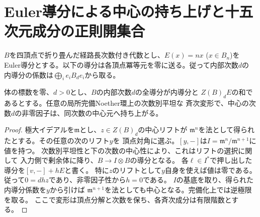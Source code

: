 \section{Euler導分による中心の持ち上げと十五次元成分の正則開集合}
\label{sec:quartic-euler-lifting}
$B$を四頂点で折り畳んだ経路長次数付き代数とし、$E(x)=n x$ ($x\in B_n$)を
Euler導分とする。以下の導分は各頂点冪等元を零に送る。従って内部次数$d$の
内導分の係数は$\bigoplus_i e_i B_d e_i$から取る。

\begin{proposition}\label{prop:euler-central-lifting}
体の標数を零、$d>0$とし、$B$の内部次数$d$の全導分が内導分と
$Z(B)_d E$の和であるとする。任意の局所完備Noether環上の次数別平坦な
斉次変形で、中心の次数$d$の非零因子は、同次数の中心元へ持ち上がる。
\end{proposition}
\begin{proof}
極大イデアルを$\mathfrak m$とし、$z\in Z(B)_d$の中心リフトが
$\mathfrak m^n$を法として得られたとする。その任意の次のリフト$y$を
頂点対角に選ぶ。$[y,-]$は$I=\mathfrak m^n/\mathfrak m^{n+1}$に値を持つ。
次数別平坦性と下の次数の中心性により、これはリフトの選択に関して
入力側で剰余体に降り、$B\to I\otimes B$の導分となる。
各$\ell\in I^*$で押し出した導分を$[v,-]+hE$と書く。
特に$z$のリフトとして$y$自身を使えば値は零である。
従って$0=dhz$であり、非零因子性から$h=0$である。
$I$の基底を取り、得られた内導分係数を$y$から引けば
$\mathfrak m^{n+1}$を法としても中心となる。完備化上では逆極限を取る。
ここで変形は頂点分解と次数を保ち、各斉次成分は有限階数とする。
\end{proof}


